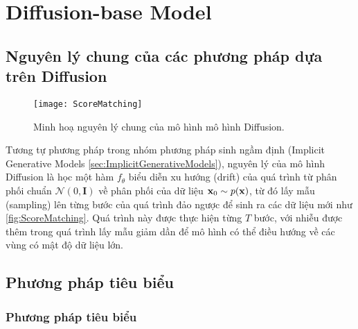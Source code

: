 \section{Diffusion-base Model}
\label{sec:diffusionbase}

\subsection{Nguyên lý chung của các phương pháp dựa trên Diffusion}

\begin{figure}[H]
	\centering
	\texttt{[image: ScoreMatching]}
	\caption{Minh hoạ nguyên lý chung của mô hình mô hình Diffusion.}
	\label{fig:ScoreMatching}
\end{figure}

Tương tự phương pháp trong nhóm phương pháp sinh ngầm định (Implicit Generative Models \autoref{sec:ImplicitGenerativeModels}), nguyên lý của mô hình Diffusion là học một hàm $f_{\theta}$ biểu diễn xu hướng (drift) của quá trình từ phân phối chuẩn $\mathcal{N}(0, \mathbf{I})$ về phân phối của dữ liệu $\mathbf{x}_{0} \sim p(\mathbf{x})$, từ đó lấy mẫu (sampling) lên từng bước của quá trình đảo ngược để sinh ra các dữ liệu mới như \autoref{fig:ScoreMatching}.
Quá trình này được thực hiện từng $T$ bước, với nhiễu được thêm trong quá trình lấy mẫu giảm dần để mô hình có thể điều hướng về các vùng có mật độ dữ liệu lớn.

\subsection{Phương pháp tiêu biểu}
\label{subsec:TypicalMethod}

\subsubsection{Phương pháp tiêu biểu}

